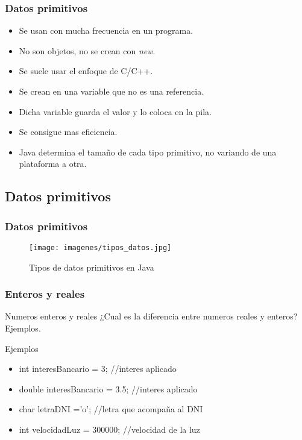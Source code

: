 \documentclass{beamer}
\begin{document}
\begin{frame}
    \frametitle{Datos primitivos}

\begin{itemize}[<+-| alert@+>]
      \item Se usan con mucha frecuencia en un programa.
      \item No son objetos, no se crean con \emph{new}.
      \item Se suele usar el enfoque de C/C++.
      \item Se crean en una variable que no es una referencia.
      \item Dicha variable guarda el valor y lo coloca en la pila.
      \item Se consigue mas eficiencia.
      \item Java determina el tamaño de cada tipo primitivo, no variando de una plataforma a otra.      
    \end{itemize}
    \pause

\end{frame}

\subsection{Datos primitivos}

\begin{frame}
    \frametitle{Datos primitivos}
\begin{figure}
\texttt{[image: imagenes/tipos\_datos.jpg]} 
\caption{Tipos de datos primitivos en Java}
\end{figure}

\end{frame}

\begin{frame}
    \frametitle{Enteros y reales}
\begin{block}{Numeros enteros y reales}
¿Cual es la diferencia entre numeros reales y enteros? Ejemplos.
\end{block}
\pause
\begin{block}{Ejemplos}
\begin{itemize}[<+-| alert@+>]
\item int interesBancario = 3; //interes aplicado
\item double interesBancario = 3.5; //interes aplicado
\item char letraDNI ='o'; //letra que acompaña al DNI
\item int velocidadLuz = 300000; //velocidad de la luz
\end{itemize}
\end{block}
\pause

\end{frame}
\end{document}
